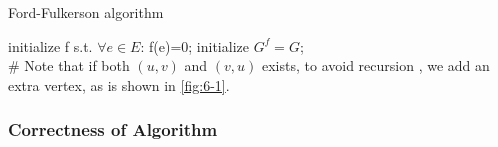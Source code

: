 \begin{algorithm}
    \caption{Ford-Fulkerson algorithm}
    initialize f s.t. $\forall e \in E$: f(e)=0; initialize $G^f=G$;\\
    \# Note that if both $(u,v)$ and $(v,u)$ exists, to avoid recursion , we add an extra vertex, as is shown in \ref{fig:6-1}.\\
\end{algorithm}
\subsubsection{Correctness of Algorithm}

